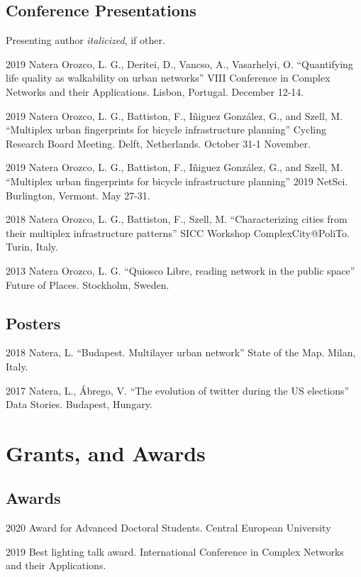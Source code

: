 \documentclass{academiccv}
\begin{document}
\subsection*{Conference Presentations}
Presenting author \textit{italicized}, if other.\bigskip
\begin{tablist}
	\item[2019] \tab Natera Orozco, L. G., Deritei, D., Vancso, A., Vasarhelyi, O. \enquote{Quantifying life quality as walkability on urban networks} VIII Conference in Complex Networks and their Applications. Lisbon, Portugal. December 12-14.
	\item[2019] \tab Natera Orozco, L. G., Battiston, F., Iñiguez González, G., and Szell, M. \enquote{Multiplex urban fingerprints for bicycle infrastructure planning} Cycling Research Board Meeting. Delft, Netherlands. October 31-1 November.
	\item[2019] \tab Natera Orozco, L. G., Battiston, F., Iñiguez González, G., and Szell, M. \enquote{Multiplex urban fingerprints for bicycle infrastructure planning} 2019 NetSci. Burlington, Vermont. May 27-31.
	\item[2018] \tab Natera Orozco, L. G., Battiston, F., Szell, M. \enquote{Characterizing cities from their multiplex infrastructure patterns} SICC Workshop ComplexCity@PoliTo. Turin, Italy.
	\item[2013] \tab Natera Orozco, L. G. \enquote{Quiosco Libre, reading network in the public space} Future of Places. Stockholm, Sweden.
\end{tablist}

\subsection*{Posters}
\begin{tablist}
	\item[2018] \tab Natera, L. \enquote{Budapest. Multilayer urban network} State of the Map. Milan, Italy.
	\item[2017] \tab Natera, L., Ábrego, V. \enquote{The evolution of twitter during the US elections} Data Stories. Budapest, Hungary.
\end{tablist}

\section*{Grants, and Awards}
\subsection*{Awards}
\begin{tablist}
	\item[2020] \tab Award for Advanced Doctoral Students. Central European University 
	\item[2019] \tab Best lighting talk award. International Conference in Complex Networks and their Applications. 
\end{tablist}
\end{document}

